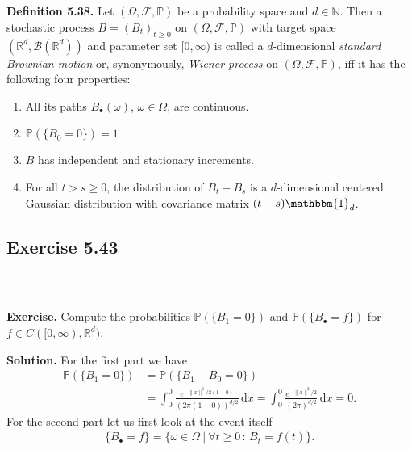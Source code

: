\documentclass{beamer}
\numberwithin{equation}{section}
\newcommand{\task}[1]{
    \begin{center}
        \colorbox{red}{
            \textsf{
                \textbf{#1}
            }
        }
    \end{center}
}
\newenvironment{frame2}{\begin{frame}\frametitle{{\normalsize \secname} \\ {\large \subsecname}}}{\end{frame}}
\begin{document}
\begin{frame2}
    \textbf{Definition 5.38.} Let $(\Omega,\mathcal{F},\mathbb{P})$ be a probability space and $d\in\mathbb{N}$.
    Then a stochastic process $B = (B_t)_{t\geq 0}$ on $(\Omega,\mathcal{F},\mathbb{P})$ with target space $(\mathbb{R}^d,\mathcal{B}(\mathbb{R}^d))$ and parameter set $[0,\infty)$ is called a $d$-dimensional \textit{standard Brownian motion} or, synonymously, \textit{Wiener process} on $(\Omega,\mathcal{F},\mathbb{P})$, iff it has the following four properties:
    \begin{enumerate}
        \item All its paths $B_\bullet(\omega)$, $\omega \in \Omega$, are continuous.
        \item $\mathbb{P}(\{B_0 = 0\})=1$ %
        \item $B$ has independent and stationary increments.
        \item For all $t > s \geq 0$, the distribution of $B_t - B_s$ is a $d$-dimensional centered Gaussian distribution with covariance matrix $(t-s)\mathbbm{1}_d$. %
    \end{enumerate}
\end{frame2}

\subsection{Exercise 5.43}

\begin{frame2}
    \textbf{Exercise.} Compute the probabilities $\mathbb{P}(\{B_1 = 0\})$ and $\mathbb{P}(\{B_\bullet = f\})$ for $f \in C([0,\infty),\mathbb{R}^d)$.

    \vspace{10pt}
    \textbf{Solution.} 
    For the first part we have
    \begin{align*}
        \mathbb{P}(\{B_1 = 0\}) &= \mathbb{P}(\{B_1 - B_0 = 0\}) \\
        &= \int_0^0 \frac{e^{-\|x\|^2/2(1-0)}}{(2\pi(1 - 0))^{d/2}}\,\text{d}x = \int_0^0 \frac{e^{-\|x\|^2/2}}{(2\pi)^{d/2}}\,\text{d}x = 0.
    \end{align*}
    For the second part let us first look at the event itself
    \begin{align}
        \{B_\bullet = f\} = \{\omega \in \Omega \ | \ \forall t\geq 0\,:\, B_t = f(t)\}.
    \end{align}
\end{frame2}
\end{document}
